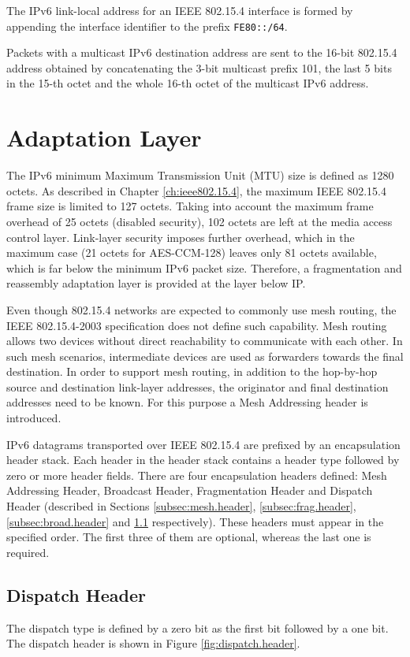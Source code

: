 \documentclass[12pt, titlepage, a4paper]{report}
\begin{document}
The IPv6 link-local address for an IEEE 802.15.4 interface is formed by appending the interface identifier to the prefix \texttt{FE80::/64}.

Packets with a multicast IPv6 destination address are sent to the 16-bit 802.15.4 address obtained by concatenating the 3-bit multicast prefix 101, the last 5 bits in the 15-th octet and the whole 16-th octet of the multicast IPv6 address.

\section{Adaptation Layer}\label{sec:adapt.layer}
The IPv6 minimum Maximum Transmission Unit (MTU) size is defined as 1280 octets. As described in Chapter \ref{ch:ieee802.15.4}, the maximum IEEE 802.15.4 frame size is limited to 127 octets.  Taking into account the maximum frame overhead of 25 octets (disabled security), 102 octets are left at the media access control layer. Link-layer security imposes further overhead, which in the maximum case (21 octets for AES-CCM-128) leaves only 81 octets available, which is far below the minimum IPv6 packet size. Therefore, a fragmentation and reassembly adaptation layer is provided at the layer below IP.

Even though 802.15.4 networks are expected to commonly use mesh routing, the IEEE 802.15.4-2003 \cite{ieee802.15.4} specification does not define such capability. Mesh routing allows two devices  without direct reachability to communicate with each other. In such mesh scenarios, intermediate devices are used as forwarders towards the final destination. In order to support mesh routing, in addition to the hop-by-hop source and destination link-layer addresses, the originator and final destination addresses need to be known. For this purpose a Mesh Addressing header is introduced.


IPv6 datagrams transported over IEEE 802.15.4 are prefixed by an encapsulation header stack. Each header in the header stack contains a header type followed by zero or more header fields.  There are four encapsulation headers defined: Mesh Addressing Header, Broadcast Header, Fragmentation Header and Dispatch Header (described in Sections \ref{subsec:mesh.header}, \ref{subsec:frag.header},\ref{subsec:broad.header} and \ref{subsec:dispatch.header} respectively). These headers must appear in the specified order. The first three of them are optional, whereas the last one is required.

\subsection{Dispatch Header}\label{subsec:dispatch.header}
The dispatch type is defined by a zero bit as the first bit followed by a one bit. The dispatch header is shown in Figure \ref{fig:dispatch.header}.
\end{document}
